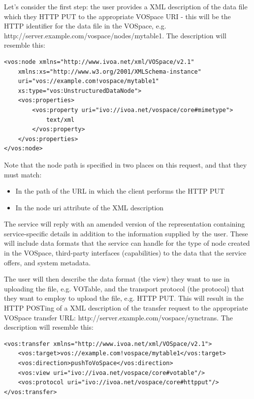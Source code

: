 \documentclass[11pt,a4paper]{ivoa}
\begin{document}
Let's consider the first step: the user provides a XML description of the data file which they HTTP PUT to the appropriate VOSpace URI - this will be the HTTP identifier for the data file in the VOSpace, e.g. http://server.example.com/vospace/nodes/mytable1. The description will resemble this:

\begin{lstlisting}
<vos:node xmlns="http://www.ivoa.net/xml/VOSpace/v2.1"
    xmlns:xs="http://www.w3.org/2001/XMLSchema-instance" 
    uri="vos://example.com!vospace/mytable1"
    xs:type="vos:UnstructuredDataNode">  
    <vos:properties> 
        <vos:property uri="ivo://ivoa.net/vospace/core#mimetype">
            text/xml
        </vos:property>     
    </vos:properties> 
</vos:node> 
\end{lstlisting}
\noindent
Note that the node path is specified in two places on this request, and that they must match:
\begin{itemize}
   \item In the path of the URL in which the client performs the HTTP PUT
   \item In the node uri attribute of the XML description
\end{itemize}

The service will reply with an amended version of the representation containing service-specific details in addition to the information supplied by the user. These will include data formats that the service can handle for the type of node created in the VOSpace, third-party interfaces (capabilities) to the data that the service offers, and system metadata.

The user will then describe the data format (the view) they want to use in uploading the file, e.g. VOTable, and the transport protocol (the protocol) that they want to employ to upload the file, e.g. HTTP PUT. This will result in the HTTP POSTing of a XML description of the transfer request to the appropriate VOSpace transfer URL:  http://server.example.com/vospace/synctrans. The description will resemble this:

\begin{lstlisting}
<vos:transfer xmlns="http://www.ivoa.net/xml/VOSpace/v2.1">
    <vos:target>vos://example.com!vospace/mytable1</vos:target>
    <vos:direction>pushToVoSpace</vos:direction> 
    <vos:view uri="ivo://ivoa.net/vospace/core#votable"/> 
    <vos:protocol uri="ivo://ivoa.net/vospace/core#httpput"/>  
</vos:transfer>
\end{lstlisting}
\end{document}
